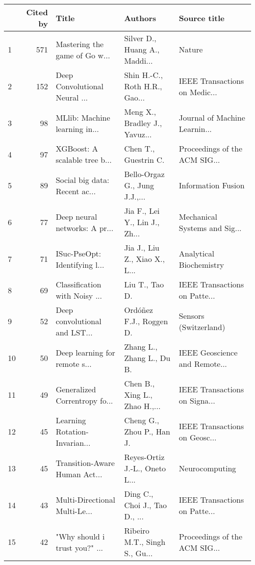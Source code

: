 \begin{tabular}{lrlll}
\toprule
{} &  Cited by &                          Title &                        Authors &                   Source title \\
\midrule
1  &       571 &  Mastering the game of Go w... &  Silver D., Huang A., Maddi... &                         Nature \\
2  &       152 &  Deep Convolutional Neural ... &  Shin H.-C., Roth H.R., Gao... &  IEEE Transactions on Medic... \\
3  &        98 &  MLlib: Machine learning in... &  Meng X., Bradley J., Yavuz... &  Journal of Machine Learnin... \\
4  &        97 &  XGBoost: A scalable tree b... &           Chen T., Guestrin C. &  Proceedings of the ACM SIG... \\
5  &        89 &  Social big data: Recent ac... &  Bello-Orgaz G., Jung J.J.,... &             Information Fusion \\
6  &        77 &  Deep neural networks: A pr... &  Jia F., Lei Y., Lin J., Zh... &  Mechanical Systems and Sig... \\
7  &        71 &  ISuc-PseOpt: Identifying l... &  Jia J., Liu Z., Xiao X., L... &        Analytical Biochemistry \\
8  &        69 &  Classification with Noisy ... &                 Liu T., Tao D. &  IEEE Transactions on Patte... \\
9  &        52 &  Deep convolutional and LST... &        Ordóñez F.J., Roggen D. &          Sensors (Switzerland) \\
10 &        50 &  Deep learning for remote s... &      Zhang L., Zhang L., Du B. &  IEEE Geoscience and Remote... \\
11 &        49 &  Generalized Correntropy fo... &  Chen B., Xing L., Zhao H.,... &  IEEE Transactions on Signa... \\
12 &        45 &  Learning Rotation-Invarian... &      Cheng G., Zhou P., Han J. &  IEEE Transactions on Geosc... \\
13 &        45 &  Transition-Aware Human Act... &  Reyes-Ortiz J.-L., Oneto L... &                 Neurocomputing \\
14 &        43 &  Multi-Directional Multi-Le... &  Ding C., Choi J., Tao D., ... &  IEEE Transactions on Patte... \\
15 &        42 &  "Why should i trust you?" ... &  Ribeiro M.T., Singh S., Gu... &  Proceedings of the ACM SIG... \\
\bottomrule
\end{tabular}
